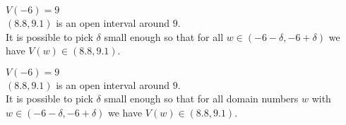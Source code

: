 \documentclass{ximera}
\begin{document}
\begin{exercise}
\begin{question}



$V(-6) = 9$ \\


$(8.8, 9.1)$ is an open interval around $9$. \\


It is possible to pick $\delta$ small enough so that for all $w \in (-6 - \delta, -6 + \delta)$ we have $V(w) \in (8.8, 9.1)$.


\begin{multipleChoice}
\end{multipleChoice}




\end{question}











\begin{question}



$V(-6) = 9$ \\


$(8.8, 9.1)$ is an open interval around $9$. \\


It is possible to pick $\delta$ small enough so that for all domain numbers $w$ with $w \in (-6 - \delta, -6 + \delta)$ we have $V(w) \in (8.8, 9.1)$.


\begin{multipleChoice}
\end{multipleChoice}




\end{question}








\end{exercise}
\end{document}
